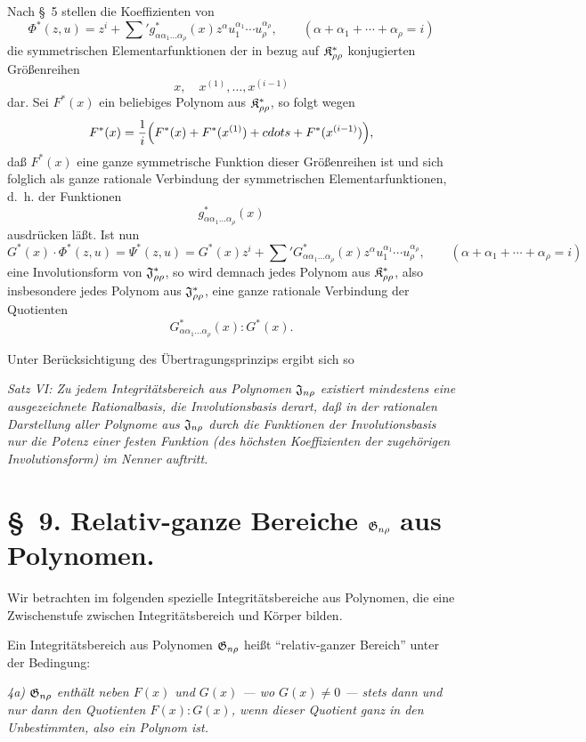 Nach \S\ 5 stellen die Koeffizienten von
\[
  \Phi^*(z,u)=z^i+\sum{}' g^*_{\alpha\alpha_1\ldots\alpha_\rho}(x)
  z^\alpha u_1^{\alpha_1}\cdots u_\rho^{\alpha_\rho},
  \qquad
  (\alpha+\alpha_1+\cdots+\alpha_\rho=i)
\]
die symmetrischen Elementarfunktionen der in bezug auf $\mathfrak{K}^*_{\rho\rho}$ konjugierten Größenreihen
\[
  x,\quad x^{(1)},\ldots,x^{(i-1)}
\]
dar. Sei $F^*(x)$ ein beliebiges Polynom aus $\mathfrak{K}^*_{\rho\rho}$, so folgt wegen
\[
  F^*(x)=\frac1i\Bigl(F^*(x)+F^*(x^{(1)})+\\cdots+F^*(x^{(i-1)})\Bigr),
\]
daß $F^*(x)$ eine ganze symmetrische Funktion dieser Größenreihen ist und sich folglich als ganze rationale Verbindung der symmetrischen Elementarfunktionen, d.~h. der Funktionen
\[
  g^*_{\alpha\alpha_1\ldots\alpha_\rho}(x)
\]
ausdrücken läßt. Ist nun
\[
  G^*(x)\cdot\Phi^*(z,u)=\Psi^*(z,u)
  =G^*(x)z^i+
  \sum{}'G^*_{\alpha\alpha_1\ldots\alpha_\rho}(x)
  z^\alpha u_1^{\alpha_1}\cdots u_\rho^{\alpha_\rho},
  \qquad
  (\alpha+\alpha_1+\cdots+\alpha_\rho=i)
\]
eine Involutionsform von $\mathfrak{J}^*_{\rho\rho}$, so wird demnach jedes Polynom aus $\mathfrak{K}^*_{\rho\rho}$, also insbesondere jedes Polynom aus $\mathfrak{J}^*_{\rho\rho}$, eine ganze rationale Verbindung der Quotienten
\[
  G^*_{\alpha\alpha_1\ldots\alpha_\rho}(x):G^*(x).
\]

Unter Berücksichtigung des Übertragungsprinzips ergibt sich so

\emph{Satz VI: Zu jedem Integritätsbereich aus Polynomen $\mathfrak{J}_{n\rho}$ existiert mindestens eine ausgezeichnete Rationalbasis, die Involutionsbasis derart, daß in der rationalen Darstellung aller Polynome aus $\mathfrak{J}_{n\rho}$ durch die Funktionen der Involutionsbasis nur die Potenz einer festen Funktion (des höchsten Koeffizienten der zugehörigen Involutionsform) im Nenner auftritt.}

\section*{\S\ 9. Relativ-ganze Bereiche $\mathfrak{G}_{n\rho}$ aus Polynomen.}

Wir betrachten im folgenden spezielle Integritätsbereiche aus Polynomen, die eine Zwischenstufe zwischen Integritätsbereich und Körper bilden.

Ein Integritätsbereich aus Polynomen $\mathfrak{G}_{n\rho}$ heißt ``relativ-ganzer Bereich'' unter der Bedingung:

\emph{4a) $\mathfrak{G}_{n\rho}$ enthält neben $F(x)$ und $G(x)$ --- wo $G(x)\ne0$ --- stets dann und nur dann den Quotienten $F(x):G(x)$, wenn dieser Quotient ganz in den Unbestimmten, also ein Polynom ist.}


